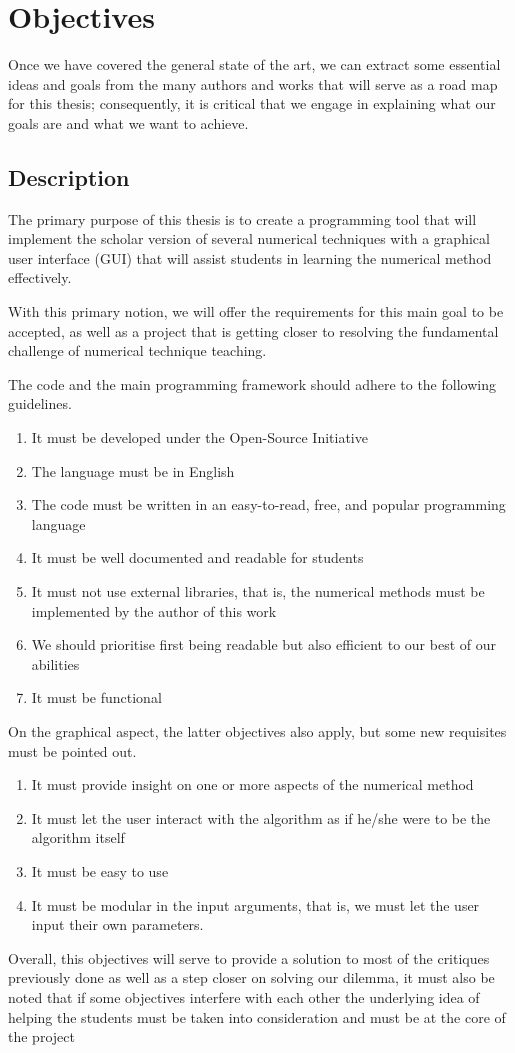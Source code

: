 \chapter{Objectives}
Once we have covered the general state of the art, we can extract some essential ideas and goals from the many authors and works that will serve as a road map for this thesis; consequently, it is critical that we engage in explaining what our goals are and what we want to achieve.

\section{Description}
The primary purpose of this thesis is to create a programming tool that will implement the scholar version of several numerical techniques with a graphical user interface (GUI) that will assist students in learning the numerical method effectively.

With this primary notion, we will offer the requirements for this main goal to be accepted, as well as a project that is getting closer to resolving the fundamental challenge of numerical technique teaching.

The code and the main programming framework should adhere to the following guidelines.
\begin{enumerate}
    \item It must be developed under the Open-Source Initiative
    \item The language must be in English
    \item The code must be written in an easy-to-read, free, and popular programming language
    \item It must be well documented and readable for students
    \item It must not use external libraries, that is, the numerical methods must be implemented by the author of this work
    \item We should prioritise first being readable but also efficient to our best of our abilities
    \item It must be functional
\end{enumerate}

On the graphical aspect, the latter objectives also apply, but some new requisites must be pointed out.
\begin{enumerate}
    \item It must provide insight on one or more aspects of the numerical method
    \item It must let the user interact with the algorithm as if he/she were to be the algorithm itself
    \item It must be easy to use
    \item It must be modular in the input arguments, that is, we must let the user input their own parameters.
\end{enumerate}

Overall, this objectives will serve to provide a solution to most of the critiques previously done as well as a step closer on solving our dilemma, it must also be noted that if some objectives interfere with each other the underlying idea of helping the students must be taken into consideration and must be at the core of the project
